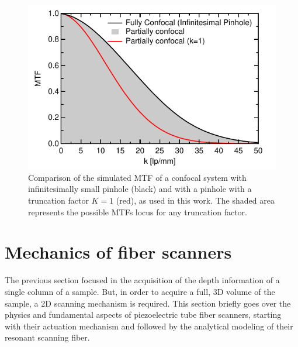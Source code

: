 \begin{figure}[h!]\centering \includegraphics{figures/20_Theory/Optical/imaging/fullPartialConfocal.pdf}
      \caption{	Comparison of the simulated MTF of a confocal system with infinitesimally small pinhole (black) and with a pinhole with a truncation factor $K=1$ (red), as used in this work. The shaded area represents the possible MTFs locus for any truncation factor.}
      \label{fig:fullPartialConfocal}
\end{figure}

\section{Mechanics of fiber scanners}

The previous section focused in the acquisition of the depth information of a single column of a sample. But, in order to acquire a full, 3D volume of the sample, a 2D scanning mechanism is required. This section briefly goes over the physics and fundamental aspects of piezoelectric tube fiber scanners, starting with their actuation mechanism and followed by the analytical modeling of their resonant scanning fiber.

